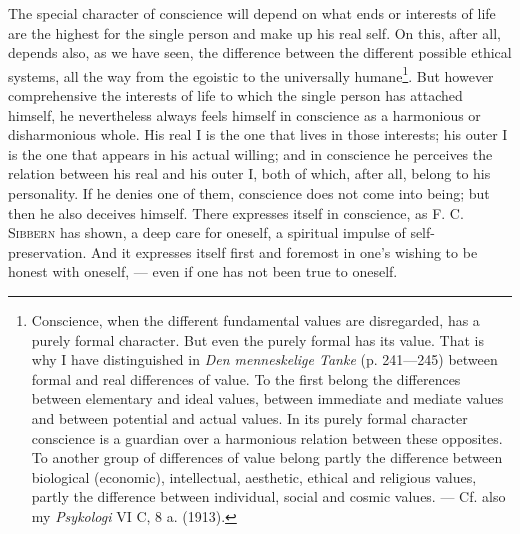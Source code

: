 \documentclass[12pt,a4paper,openany]{book}
\begin{document}
The special character of conscience will depend on what ends or interests of life are the highest for
the single person and make up his real self. On this, after all, depends also, as we have seen, the
difference between the different possible ethical systems, all the way from the egoistic to the
universally humane\footnote[1]{Conscience, when the different fundamental values are disregarded, has
a purely formal character. But even the purely formal has its value. That is why I have distinguished
in \textit{Den menneskelige Tanke} (p. 241---245) between formal and real differences of value. To the
first belong the differences between elementary and ideal values, between immediate and mediate values
and between potential and actual values. In its purely formal character conscience is a guardian over
a harmonious relation between these opposites. To another group of differences of value belong partly
the difference between biological (economic), intellectual, aesthetic, ethical and religious values,
partly the difference between individual, social and cosmic values. --- Cf. also my \textit{Psykologi}
VI C, 8 a. (1913).}. But however comprehensive the interests of life to which the single person has
attached himself, he nevertheless always feels himself in conscience as a harmonious or disharmonious
whole. His real I is the one that lives in those interests; his outer I is the one that appears in his
actual willing; and in conscience he perceives the relation between his real and his outer I, both of
which, after all, belong to his personality. If he denies one of them, conscience does not come into
being; but then he also deceives himself. There expresses itself in conscience, as F. C.
\textsc{Sibbern} has shown, a deep care for oneself, a spiritual impulse of self-preservation. And it
expresses itself first and foremost in one's wishing to be honest with oneself, --- even if one has not
been true to oneself.
\end{document}
